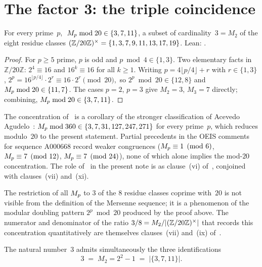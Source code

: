 \section{The factor 3: the triple coincidence}
\label{sec:triple}

\begin{Theorem}\label{thm:concentration-main}
For every prime~$p$, $\;M_{p}\bmod 20 \in \{3,7,11\}$, a subset of
cardinality~$3=M_{2}$ of the eight residue classes
$(\mathbb{Z}/20\mathbb{Z})^{\times}=\{1,3,7,9,11,13,17,19\}$.  Lean:
.
\end{Theorem}

\begin{proof}
For $p\geq 5$ prime, $p$ is odd and $p\bmod 4\in\{1,3\}$.  Two
elementary facts in $\mathbb{Z}/20\mathbb{Z}$: $2^{4}\equiv 16$ and
$16^{k}\equiv 16$ for all $k\geq 1$.  Writing $p=4\lfloor p/4\rfloor+r$
with $r\in\{1,3\}$,
$
  2^{p} = 16^{\lfloor p/4\rfloor}\cdot 2^{r} \equiv 16\cdot 2^{r}
  \pmod{20},
$
so $2^{p}\bmod 20\in\{12,8\}$ and $M_{p}\bmod 20\in\{11,7\}$.  The cases
$p=2$, $p=3$ give $M_{2}=3$, $M_{3}=7$ directly; combining,
$M_{p}\bmod 20\in\{3,7,11\}$.
\end{proof}

\begin{Remark}\label{rem:acevedo}
The concentration of~ is a corollary of
the stronger classification of Acevedo
Agudelo~\cite{acevedo-2020}:
$M_{p}\bmod 360\in\{3,7,31,127,247,271\}$ for every prime~$p$, which
reduces modulo~$20$ to the present statement. Partial precedents in
the OEIS comments for sequence A000668 record weaker congruences
($M_{p}\equiv 1\pmod{6}$, $M_{p}\equiv 7\pmod{12}$,
$M_{p}\equiv 7\pmod{24}$), none of which alone implies the mod-$20$
concentration. The role of~ in the
present note is as clause~(vi)
of~, conjoined with clauses~(vii) and~(xi).
\end{Remark}

The restriction of all $M_{p}$ to $3$ of the $8$ residue classes coprime
with~$20$ is not visible from the definition of the Mersenne sequence;
it is a phenomenon of the modular doubling pattern $2^{p}\bmod 20$
produced by the proof above.  The numerator and denominator of the
ratio $3/8=M_{2}/|(\mathbb{Z}/20\mathbb{Z})^{\times}|$ that records this concentration
quantitatively are themselves clauses~(vii) and~(ix)
of~.

\begin{Theorem}\label{thm:three-main}
The natural number~$3$ admits simultaneously the three identifications
\[
  3 \;=\; M_{2}=2^{2}-1 \;=\; \bigl|\{3,7,11\}\bigr|.
\]
\end{Theorem}


